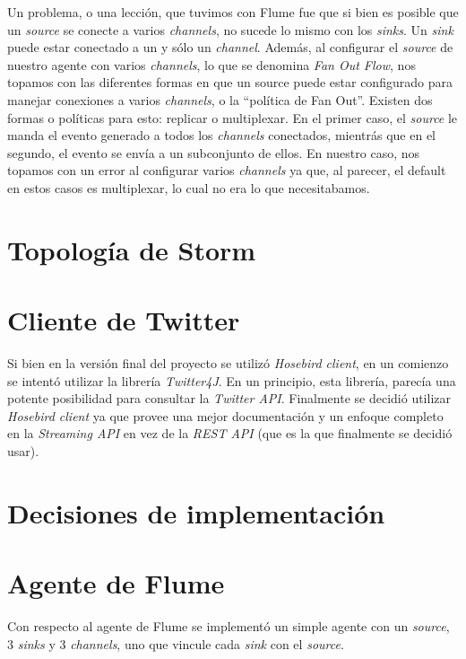 \documentclass[a4paper,10pt]{article}
\begin{document}
Un problema, o una lección, que tuvimos con Flume fue que si bien es posible que un \textit{source} se conecte a varios \textit{channels}, no sucede lo mismo con los \textit{sinks}.
Un \textit{sink} puede estar conectado a un y sólo un \textit{channel}. Además, al configurar el \textit{source} de nuestro agente con varios \textit{channels}, lo que 
se denomina \textit{Fan Out Flow}, nos topamos con las
diferentes formas en que un source puede estar configurado para manejar conexiones a varios \textit{channels}, o la ``política de Fan Out''. Existen dos formas o políticas para esto:
replicar o multiplexar. En el primer caso, el \textit{source} le manda el evento generado a todos los \textit{channels} conectados, mientrás que en el segundo, el evento se envía
a un subconjunto de ellos. En nuestro caso, nos topamos con un error al configurar varios \textit{channels} ya que, al parecer, el default en estos casos es multiplexar, lo cual no 
era lo que necesitabamos.

\section{Topología de Storm}

\section{Cliente de Twitter}

Si bien en la versión final del proyecto se utilizó \textit{Hosebird client}, en un comienzo se intentó utilizar la librería \textit{Twitter4J}. En un principio, esta librería,
parecía una potente posibilidad para consultar la \textit{Twitter API}. Finalmente se decidió utilizar \textit{Hosebird client} ya que provee una mejor documentación y un enfoque
completo en la \textit{Streaming API} en vez de la \textit{REST API} (que es la que finalmente se decidió usar).

\section{Decisiones de implementación}

\section{Agente de Flume}
Con respecto al agente de Flume se implementó un simple agente con un \textit{source}, 3 \textit{sinks} y 3 \textit{channels}, uno que vincule cada \textit{sink} con el 
\textit{source}. 
\end{document}
